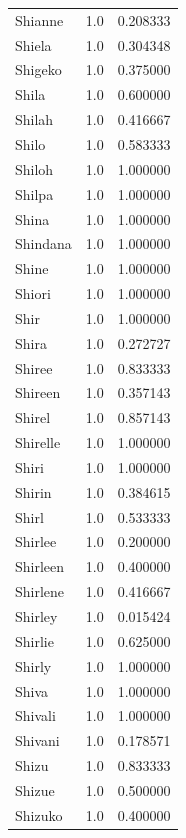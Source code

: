 \documentclass[
  letterpaper,
  DIV=11,
  numbers=noendperiod]{scrreprt}
\begin{document}
\begin{tabular}{lrr}
Shianne         &   1.0 &   0.208333 \\
Shiela          &   1.0 &   0.304348 \\
Shigeko         &   1.0 &   0.375000 \\
Shila           &   1.0 &   0.600000 \\
Shilah          &   1.0 &   0.416667 \\
Shilo           &   1.0 &   0.583333 \\
Shiloh          &   1.0 &   1.000000 \\
Shilpa          &   1.0 &   1.000000 \\
Shina           &   1.0 &   1.000000 \\
Shindana        &   1.0 &   1.000000 \\
Shine           &   1.0 &   1.000000 \\
Shiori          &   1.0 &   1.000000 \\
Shir            &   1.0 &   1.000000 \\
Shira           &   1.0 &   0.272727 \\
Shiree          &   1.0 &   0.833333 \\
Shireen         &   1.0 &   0.357143 \\
Shirel          &   1.0 &   0.857143 \\
Shirelle        &   1.0 &   1.000000 \\
Shiri           &   1.0 &   1.000000 \\
Shirin          &   1.0 &   0.384615 \\
Shirl           &   1.0 &   0.533333 \\
Shirlee         &   1.0 &   0.200000 \\
Shirleen        &   1.0 &   0.400000 \\
Shirlene        &   1.0 &   0.416667 \\
Shirley         &   1.0 &   0.015424 \\
Shirlie         &   1.0 &   0.625000 \\
Shirly          &   1.0 &   1.000000 \\
Shiva           &   1.0 &   1.000000 \\
Shivali         &   1.0 &   1.000000 \\
Shivani         &   1.0 &   0.178571 \\
Shizu           &   1.0 &   0.833333 \\
Shizue          &   1.0 &   0.500000 \\
Shizuko         &   1.0 &   0.400000 \\

\end{tabular}
\end{document}
